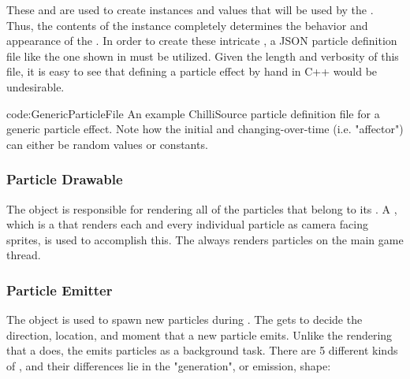 These  and  are used to create instances and values that will be used by the . Thus, the contents of the  instance completely determines the behavior and appearance of the . In order to create these intricate , a JSON particle definition file like the one shown in  must be utilized. Given the length and verbosity of this file, it is easy to see that defining a particle effect by hand in C++ would be undesirable. 

{code:GenericParticleFile}
{An example ChilliSource particle definition file for a generic particle effect. Note how the initial and changing-over-time (i.e. "affector")  can either be random values or constants. }

\subsubsection{Particle Drawable}

The  object is responsible for rendering all of the particles that belong to its . A \footnotemark, which is a  that renders each and every individual particle as camera facing sprites, is used to accomplish this. The  always renders particles on the main game thread.


\subsubsection{Particle Emitter}

The  object is used to spawn new particles during . The  gets to decide the direction, location, and moment that a new particle emits. Unlike the rendering that a  does, the  emits particles as a background task. There are 5 different kinds of , and their differences lie in the "generation", or emission, shape:

